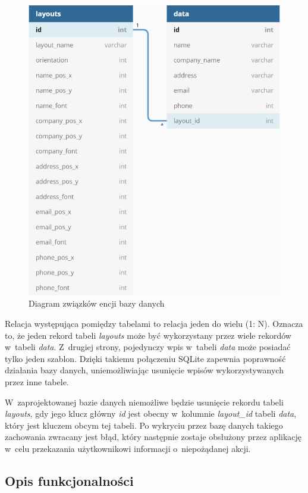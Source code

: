 \documentclass[a4paper,12pt, twoside]{article}
\begin{document}
        \begin{figure}[H]
    	        \centering
    			\includegraphics[width=12cm]{images/rys_11baza.png}
    			\caption{Diagram związków encji bazy danych}
                \label{fig:database}
    	\end{figure}
    	
        Relacja występująca pomiędzy tabelami to relacja jeden do wielu (1: N). Oznacza to, że jeden rekord tabeli \textit{layouts} może być wykorzystany przez wiele rekordów w~tabeli \textit{data}. Z~drugiej strony, pojedynczy wpis w~tabeli \textit{data} może posiadać tylko jeden szablon. Dzięki takiemu połączeniu SQLite zapewnia poprawność działania bazy danych, uniemożliwiając usunięcie wpisów wykorzystywanych przez inne tabele. 
        
        W~zaprojektowanej bazie danych niemożliwe będzie usunięcie rekordu tabeli \textit{layouts}, gdy jego klucz główny \textit{id} jest obecny w~kolumnie \textit{layout\_id} tabeli \textit{data}, który jest kluczem obcym tej tabeli. Po wykryciu przez bazę danych takiego zachowania zwracany jest błąd, który następnie zostaje obsłużony przez aplikację w~celu przekazania użytkownikowi informacji o~niepożądanej akcji.
        
        \subsection{Opis funkcjonalności}
    	
\end{document}
